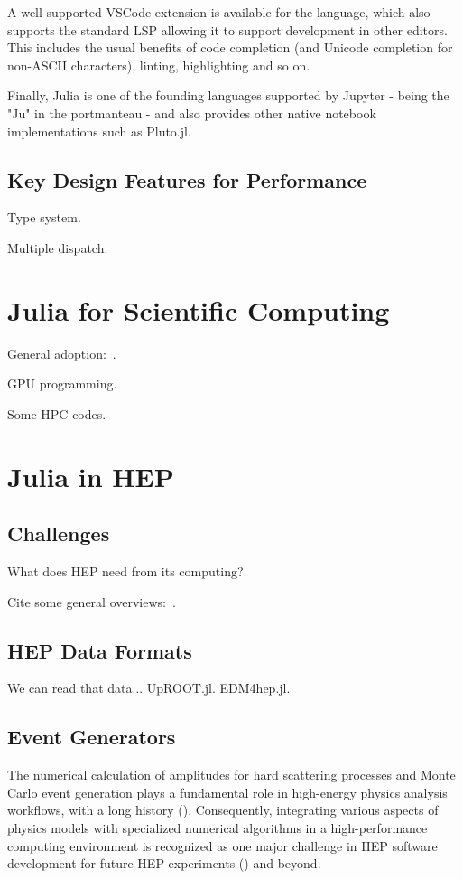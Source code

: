 \documentclass{webofc}
\begin{document}
A well-supported VSCode extension is available for the language, which also supports the standard LSP allowing it to support development in other editors. This includes 
the usual benefits of code completion (and Unicode completion for non-ASCII characters), linting, highlighting and so on.

Finally, Julia is one of the founding languages supported by Jupyter - being the "Ju" in the portmanteau - and also provides other native notebook implementations such as Pluto.jl. 

\subsection{Key Design Features for Performance}

Type system.

Multiple dispatch.

\section{Julia for Scientific Computing}

General adoption:~\cite{perkel-julia-science}.

GPU programming.

Some HPC codes.

\section{Julia in HEP}

\subsection{Challenges}

What does HEP need from its computing?

Cite some general overviews:~\cite{Stanitzki:2020bnx,eschle2023potential}.

\subsection{HEP Data Formats}

We can read that data... UpROOT.jl. EDM4hep.jl.

\subsection{Event Generators}

The numerical calculation of amplitudes for hard scattering processes and Monte Carlo event
generation plays a fundamental role in high-energy physics analysis workflows, with a
long history (\cite{campbell2024event}). Consequently, integrating various aspects of physics models with specialized
numerical algorithms in a high-performance computing environment is recognized as one major challenge
in HEP software development for future HEP experiments (\cite{HEPSoftwareFoundation:2017ggl, HSFPhysicsEventGeneratorWG:2020gxw, HSFPhysicsEventGeneratorWG:2021xti}) and beyond.
\end{document}
